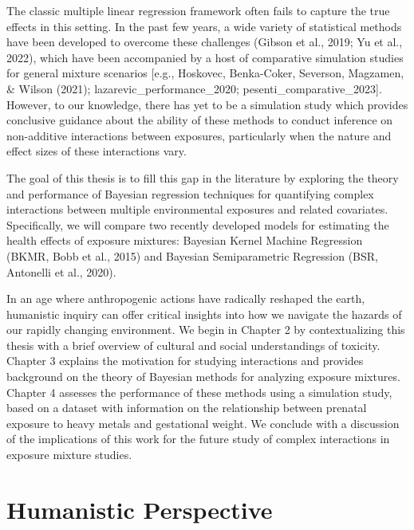 \documentclass[12pt, twoside]{amherstthesis}
\begin{document}
The classic multiple linear regression framework often fails to capture the true effects in this setting. In the past few years, a wide variety of statistical methods have been developed to overcome these challenges (Gibson et al., 2019; Yu et al., 2022), which have been accompanied by a host of comparative simulation studies for general mixture scenarios {[}e.g., Hoskovec, Benka-Coker, Severson, Magzamen, \& Wilson (2021); lazarevic\_performance\_2020; pesenti\_comparative\_2023{]}. However, to our knowledge, there has yet to be a simulation study which provides conclusive guidance about the ability of these methods to conduct inference on non-additive interactions between exposures, particularly when the nature and effect sizes of these interactions vary.

The goal of this thesis is to fill this gap in the literature by exploring the theory and performance of Bayesian regression techniques for quantifying complex interactions between multiple environmental exposures and related covariates. Specifically, we will compare two recently developed models for estimating the health effects of exposure mixtures: Bayesian Kernel Machine Regression (BKMR, Bobb et al., 2015) and Bayesian Semiparametric Regression (BSR, Antonelli et al., 2020).

In an age where anthropogenic actions have radically reshaped the earth, humanistic inquiry can offer critical insights into how we navigate the hazards of our rapidly changing environment. We begin in Chapter 2 by contextualizing this thesis with a brief overview of cultural and social understandings of toxicity. Chapter 3 explains the motivation for studying interactions and provides background on the theory of Bayesian methods for analyzing exposure mixtures. Chapter 4 assesses the performance of these methods using a simulation study, based on a dataset with information on the relationship between prenatal exposure to heavy metals and gestational weight. We conclude with a discussion of the implications of this work for the future study of complex interactions in exposure mixture studies.

\hypertarget{humanistic}{%
\chapter{Humanistic Perspective}\label{humanistic}}
\end{document}
